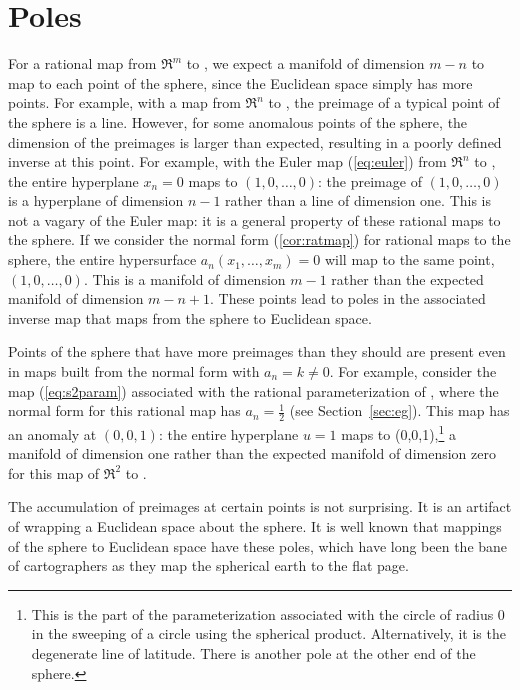 \documentclass[11pt]{article}
\begin{document}
\section{Poles}
\label{sec:pole}

For a rational map from $\Re^m$ to , 
we expect a manifold of dimension $m-n$ to map to each point of the sphere,
since the Euclidean space simply has more points.
For example, with a map from $\Re^n$ to , the preimage of a typical point
of the sphere is a line.
However, for some anomalous points of the sphere, the dimension of the preimages
is larger than expected, resulting in a poorly defined inverse at this point.
For example, with the Euler map (\ref{eq:euler}) from $\Re^n$ to ,
the entire hyperplane $x_n=0$ maps to $(1,0,\ldots,0)$:
the preimage of $(1,0,\ldots,0)$ is a hyperplane of dimension $n-1$ rather than a line
of dimension one.
This is not a vagary of the Euler map: it is a general property of these
rational maps to the sphere.
If we consider the normal form (\ref{cor:ratmap}) for rational maps to the sphere,
the entire hypersurface $a_n(x_1,\ldots,x_m)=0$ will map to the same point,
$(1,0,\ldots,0)$.
This is a manifold of dimension $m-1$ rather than the expected manifold of dimension
$m-n+1$.
These points lead to poles in the associated inverse map that maps from the sphere
to Euclidean space.

Points of the sphere that have more preimages than they should are present even in maps
built from the normal form with $a_n = k \neq 0$.
For example, consider the map (\ref{eq:s2param})
associated with the rational parameterization of ,
where the normal form for this rational map has $a_n = \frac{1}{2}$
(see Section~\ref{sec:eg}).
This map has an anomaly at $(0,0,1)$:
the entire hyperplane $u=1$ maps to (0,0,1),\footnote{This 
  is the part of the parameterization associated with the circle of radius 0 in 
  the sweeping of a circle using the spherical product.  
  Alternatively, it is the degenerate line of latitude.
  There is another pole at the other end of the sphere.}
a manifold of dimension one rather than the expected manifold of dimension zero 
for this map of $\Re^2$ to .

The accumulation of preimages at certain points is not surprising.
It is an artifact of wrapping a Euclidean space about the sphere.
It is well known that mappings of the sphere to Euclidean space have these poles,
which have long been the bane of cartographers as they map the spherical earth to
the flat page.
\end{document}

